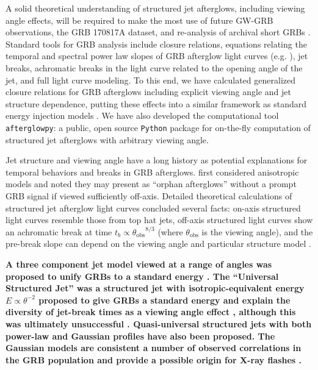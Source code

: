 \documentclass[twocolumn]{aastex62}
\newcommand{\grbbns}{GRB 170817A}
\newcommand{\afterglowpy}{{\tt afterglowpy}}
\newcommand{\python}{{\tt Python}}
\newcommand{\thobs}{\ensuremath{\theta_{\mathrm{obs}}}}
\begin{document}
A solid theoretical understanding of structured jet afterglows, including viewing angle effects, will be required to make the most use of future GW-GRB observations, the \grbbns{} dataset, and re-analysis of archival short GRBs \citep{Troja:2018ab, Troja:2019aa}. Standard tools for GRB analysis include closure relations, equations relating the temporal and spectral power law slopes of GRB afterglow light curves (e.g. \citet{Granot:2002aa, Racusin:2009aa}), jet breaks, achromatic breaks in the light curve related to the opening angle of the jet, and full light curve modeling.  To this end, we have calculated generalized closure relations for GRB afterglows including explicit viewing angle and jet structure dependence, putting these effects into a similar framework as standard energy injection models \citep{Zhang:2006aa}.
 We have also developed the computational tool \afterglowpy{}: a public, open source \python{} package for on-the-fly computation of structured jet afterglows with arbitrary viewing angle.

Jet structure and viewing angle have a long history as potential explanations for temporal behaviors and breaks in GRB afterglows.  \citet{Meszaros:1998aa} first considered anisotropic models and noted they may present as ``orphan afterglows'' without a prompt GRB signal if viewed sufficiently off-axis.  Detailed theoretical calculations of structured jet afterglow light curves concluded several facts: on-axis structured light curves resemble those from top hat jets, off-axis structured light curves show an achromatic break at time $t_b\propto \thobs^{8/3}$ (where $\thobs$ is the viewing angle), and the pre-break slope can depend on the viewing angle and particular structure model \citep{Rossi:2002aa, Dalal:2002aa, Granot:2002aa, Panaitescu:2003aa, Kumar:2003aa, Granot:2003aa, Salmonson:2003aa, Rossi:2004aa}.  

{\bf A three component jet model viewed at a range of angles was proposed to unify GRBs to a standard energy \citep{Lipunov:2001aa}.  The ``Universal Structured Jet'' was a structured jet with isotropic-equivalent energy $E \propto \theta^{-2}$ proposed to give GRBs a standard energy and explain the diversity of jet-break times as a viewing angle effect  \citep{Rossi:2002aa}, although this was ultimately unsuccessful \citep{Nakar:2004aa}.  Quasi-universal structured jets with both power-law \citep{Zhang:2002aa} and Gaussian \citep{Zhang:2004aa} profiles have also been proposed.  The Gaussian models are consistent a number of observed correlations in the GRB population and provide a possible origin for X-ray flashes \citep{Dai:2005aa}.}
\end{document}
